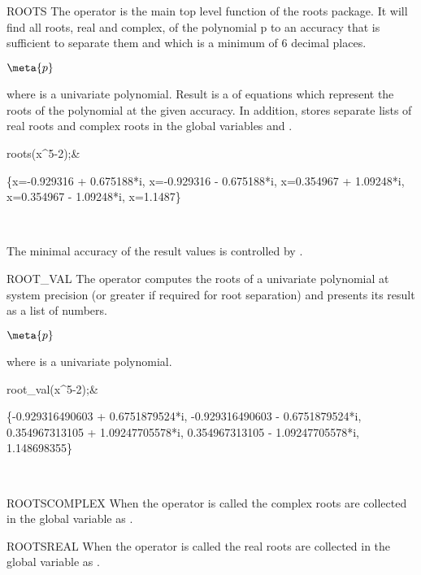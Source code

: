 \begin{Operator}{ROOTS}
The operator  
is  the main top level  function of the roots  package.
It will  find all roots, real and  complex, of the polynomial  p
to an accuracy that is sufficient to separate them  and which is
a minimum of  6 decimal places.               

\begin{Syntax}
\(\meta{p}\)
\end{Syntax}

where  is a univariate polynomial. Result is a 
of equations which represent the roots of the polynomial at the
given accuracy. In addition,   stores
separate  lists of real  roots and complex  roots in the  global
variables  and . 

\begin{Examples}
roots(x^5-2);&\begin{multilineoutput}{3cm}
\{x=-0.929316 + 0.675188*i,
  x=-0.929316 - 0.675188*i,
  x=0.354967 + 1.09248*i,
  x=0.354967 - 1.09248*i, 
  x=1.1487\}
\end{multilineoutput}\\
\end{Examples}
The minimal accuracy of the result values is controlled by 
.
\end{Operator}

\begin{Operator}{ROOT\_VAL}
The operator  computes the roots of a 
univariate polynomial at system precision
(or greater if required for root separation) and presents 
its result as a list of numbers.
\begin{Syntax}
\(\meta{p}\)
\end{Syntax}

where  is a univariate polynomial.

\begin{Examples}
root_val(x^5-2);&\begin{multilineoutput}{3cm}
\{-0.929316490603 + 0.6751879524*i,
 -0.929316490603 - 0.6751879524*i,
 0.354967313105 + 1.09247705578*i,
 0.354967313105 - 1.09247705578*i,
 1.148698355\}
\end{multilineoutput}\\
\end{Examples}
\end{Operator} 

\begin{Variable}{ROOTSCOMPLEX}
When the operator  is called the complex
roots are collected in the global variable 
as .
\end{Variable}


\begin{Variable}{ROOTSREAL}
When the operator  is called the real
roots are collected in the global variable 
as .
\end{Variable}
